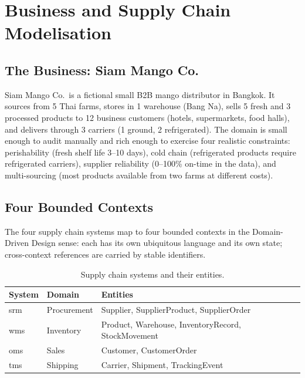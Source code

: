 
\chapter{Business and Supply Chain Modelisation}
\label{ch:modelisation}

\section{The Business: Siam Mango Co.}

Siam Mango Co.\ is a fictional small B2B mango distributor in Bangkok. It sources from 5 Thai farms, stores in 1 warehouse (Bang Na), sells 5 fresh and 3 processed products to 12 business customers (hotels, supermarkets, food halls), and delivers through 3 carriers (1 ground, 2 refrigerated). The domain is small enough to audit manually and rich enough to exercise four realistic constraints: perishability (fresh shelf life 3--10 days), cold chain (refrigerated products require refrigerated carriers), supplier reliability (0--100\% on-time in the data), and multi-sourcing (most products available from two farms at different costs).

\section{Four Bounded Contexts}

The four supply chain systems map to four bounded contexts in the Domain-Driven Design sense: each has its own ubiquitous language and its own state; cross-context references are carried by stable identifiers.

\begin{table}[H]
    \centering\small
    \begin{tabularx}{\textwidth}{|l|l|X|}
        \hline
        \rowcolor{lightgray}
        \textbf{System} & \textbf{Domain} & \textbf{Entities} \\
        \hline
        \gls{srm} & Procurement & Supplier, SupplierProduct, SupplierOrder \\
        \hline
        \gls{wms} & Inventory   & Product, Warehouse, InventoryRecord, StockMovement \\
        \hline
        \gls{oms} & Sales       & Customer, CustomerOrder \\
        \hline
        \gls{tms} & Shipping    & Carrier, Shipment, TrackingEvent \\
        \hline
    \end{tabularx}
    \caption{Supply chain systems and their entities.}
    \label{tab:systems}
\end{table}


